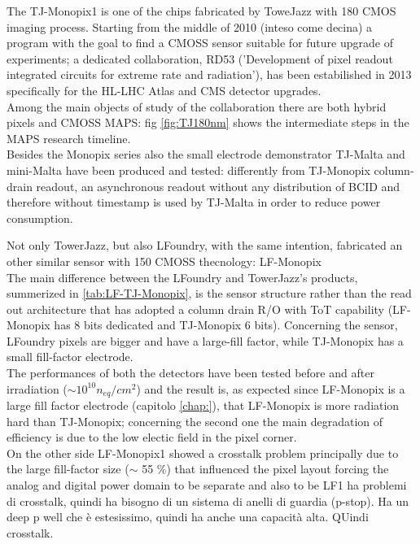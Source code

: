 The TJ-Monopix1 is one of the chips fabricated by ToweJazz with 180 CMOS imaging process. Starting from the middle of 2010 (inteso come decina) a program with the goal to find a CMOSS sensor suitable for future upgrade of experiments; a dedicated collaboration, RD53 ('Development of pixel readout integrated circuits for extreme rate and radiation'), has been estabilished in 2013 specifically for the HL-LHC Atlas and CMS detector upgrades. \\
Among the main objects of study of the collaboration there are both hybrid pixels and CMOSS MAPS: fig \ref{fig:TJ180nm} shows the intermediate steps in the MAPS research timeline.\\
Besides the Monopix series also the small electrode demonstrator TJ-Malta and mini-Malta have been produced and tested\cite{MALTA}: differently from TJ-Monopix column-drain readout, an asynchronous readout without any distribution of BCID and therefore without timestamp is used by TJ-Malta in order to reduce power consumption.

Not only TowerJazz, but also LFoundry, with the same intention, fabricated an other similar sensor with 150 CMOSS thecnology\cite{LF-Monopix}\cite{LF-TJ-Monopix}: LF-Monopix\\
The main difference between the LFoundry and TowerJazz's products, summerized in \ref{tab:LF-TJ-Monopix}, is the sensor structure rather than the read out architecture that has adopted a column drain R/O with ToT capability (LF-Monopix has 8 bits dedicated and TJ-Monopix 6 bits). Concerning the sensor, LFoundry pixels are bigger and have a large-fill factor, while TJ-Monopix has a small fill-factor electrode.\\
The performances of both the detectors have been tested before and after irradiation ($\sim 10^{10} n_{eq}/cm^{2}$) and the result is, as expected since LF-Monopix is a large fill factor electrode (capitolo \ref{chap:}), that LF-Monopix is more radiation hard than TJ-Monopix; concerning the second one the main degradation of efficiency is due to the low electic field in the pixel corner. \\
On the other side LF-Monopix1 showed a crosstalk problem principally due to the large fill-factor size ($\sim$ 55 $\%$) that influenced the pixel layout forcing the analog and digital power domain to be separate and also to be 
LF1 ha problemi di crosstalk, quindi ha bisogno di un sistema di anelli di guardia (p-stop). Ha un deep p well che è estesissimo, quindi ha anche una capacità alta. QUindi crosstalk. \\

